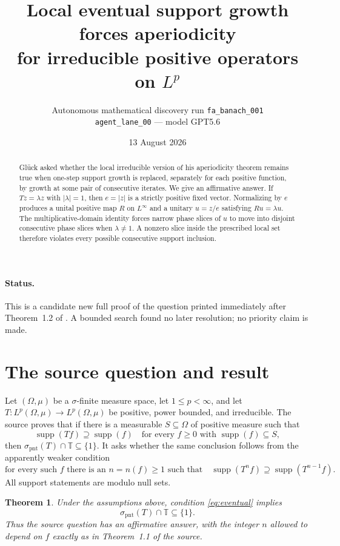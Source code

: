 \documentclass[11pt]{article}
\title{Local eventual support growth forces aperiodicity\\
for irreducible positive operators on $L^p$}
\author{Autonomous mathematical discovery run \texttt{fa\_banach\_001}\\
\texttt{agent\_lane\_00} --- model GPT5.6}
\date{13 August 2026}
\newtheorem{theorem}{Theorem}
\newcommand{\Torus}{\mathbb T}
\newcommand{\suppop}{\operatorname{supp}}
\newcommand{\spoint}{\sigma_{\mathrm{pnt}}}
\begin{document}
\maketitle

\begin{abstract}
Gl\"uck asked whether the local irreducible version of his aperiodicity
theorem remains true when one-step support growth is replaced, separately for
each positive function, by growth at some pair of consecutive iterates.  We
give an affirmative answer.  If $Tz=\lambda z$ with $|\lambda|=1$, then
$e=|z|$ is a strictly positive fixed vector.  Normalizing by $e$ produces a
unital positive map $R$ on $L^\infty$ and a unitary $u=z/e$ satisfying
$Ru=\lambda u$.  The multiplicative-domain identity forces narrow phase
slices of $u$ to move into disjoint consecutive phase slices when
$\lambda\ne1$.  A nonzero slice inside the prescribed local set therefore
violates every possible consecutive support inclusion.
\end{abstract}

\paragraph{Status.}
This is a candidate new full proof of the question printed immediately after
Theorem~1.2 of \cite{Glueck}.  A bounded search found no later resolution; no
priority claim is made.

\section{The source question and result}

Let $(\Omega,\mu)$ be a $\sigma$-finite measure space, let
$1\le p<\infty$, and let $T:L^p(\Omega,\mu)\to L^p(\Omega,\mu)$ be positive,
power bounded, and irreducible.  The source proves that if there is a
measurable $S\subseteq\Omega$ of positive measure such that
\[
 \suppop(Tf)\supseteq\suppop(f)
 \quad\text{for every }f\ge0\text{ with }\suppop(f)\subseteq S,
\]
then $\spoint(T)\cap\Torus\subseteq\{1\}$.  It asks whether the same conclusion
follows from the apparently weaker condition
\begin{equation}\label{eq:eventual}
 \text{for every such }f\text{ there is an }n=n(f)\ge1\text{ such that}
 \quad
 \suppop(T^nf)\supseteq\suppop(T^{n-1}f).
\end{equation}
All support statements are modulo null sets.

\begin{theorem}\label{thm:main}
Under the assumptions above, condition \eqref{eq:eventual} implies
\[
 \spoint(T)\cap\Torus\subseteq\{1\}.
\]
Thus the source question has an affirmative answer, with the integer $n$
allowed to depend on $f$ exactly as in Theorem~1.1 of the source.
\end{theorem}
\end{document}
